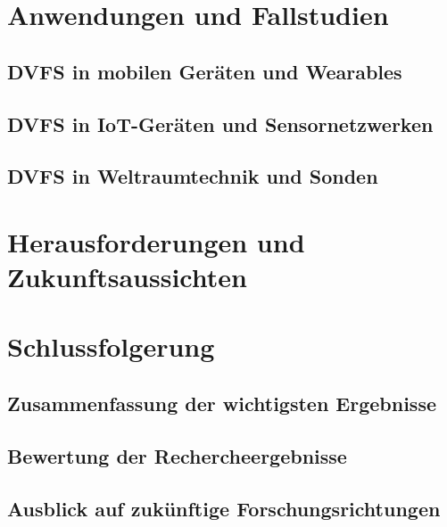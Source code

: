 \documentclass[footmark=none]{tubaf-thesis}
\begin{document}
	\chapter{Anwendungen und Fallstudien}
       	
		\section{DVFS in mobilen Geräten und Wearables}
        	
        \section{DVFS in IoT-Geräten und Sensornetzwerken}
        	
        \section{DVFS in Weltraumtechnik und Sonden}
        	
        	
        	
        \chapter{Herausforderungen und Zukunftsaussichten}
        
        
        
	\chapter{Schlussfolgerung}
        
        \section{Zusammenfassung der wichtigsten Ergebnisse}
    
    	\section{Bewertung der Rechercheergebnisse}
    		
    	\section{Ausblick auf zukünftige Forschungsrichtungen}
    
    
    
   
    



	
	

\end{document}
